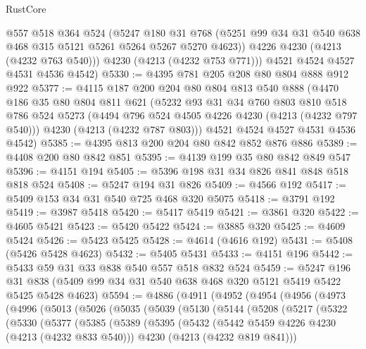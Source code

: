 \begin{lexlean}{RustCore}
\begin{coremodule}
          @557
          @518
          @364
          @524
          (@5247
            @180
            @31
            @768
            (@5251 @99 @34 @31 @540 @638 @468 @315 @5121 @5261 @5264 @5267 @5270 @4623))
          @4226
          @4230
          (@4213 (@4232 @763 @540)))
        @4230
        (@4213 (@4232 @753 @771)))
      @4521
      @4524
      @4527
      @4531
      @4536
      @4542)
@5330 := @4395 @781 @205 @208 @80 @804 @888 @912 @922
@5377 := @4115
    @187
    @200
    @204
    @80
    @804
    @813
    @540
    @888
    (@4470
      @186
      @35
      @80
      @804
      @811
      @621
      (@5232
        @93
        @31
        @34
        @760
        @803
        @810
        @518
        @786
        @524
        @5273
        (@4494 @796 @524 @4505 @4226 @4230 (@4213 (@4232 @797 @540)))
        @4230
        (@4213 (@4232 @787 @803)))
      @4521
      @4524
      @4527
      @4531
      @4536
      @4542)
@5385 := @4395 @813 @200 @204 @80 @842 @852 @876 @886
@5389 := @4408 @200 @80 @842 @851
@5395 := @4139 @199 @35 @80 @842 @849 @547
@5396 := @4151 @194
@5405 := @5396 @198 @31 @34 @826 @841 @848 @518 @818 @524
@5408 := @5247 @194 @31 @826
@5409 := @4566 @192
@5417 := @5409 @153 @34 @31 @540 @725 @468 @320 @5075
@5418 := @3791 @192
@5419 := @3987 @5418
@5420 := @5417 @5419
@5421 := @3861 @320
@5422 := @4605 @5421
@5423 := @5420 @5422
@5424 := @3885 @320
@5425 := @4609 @5424
@5426 := @5423 @5425
@5428 := @4614 (@4616 @192)
@5431 := @5408 (@5426 @5428 @4623)
@5432 := @5405 @5431
@5433 := @4151 @196
@5442 := @5433 @59 @31 @33 @838 @540 @557 @518 @832 @524
@5459 := @5247
    @196
    @31
    @838
    (@5409 @99 @34 @31 @540 @638 @468 @320 @5121 @5419 @5422 @5425 @5428 @4623)
@5594 := @4886
    (@4911
      (@4952
        (@4954
          (@4956
            (@4973
              (@4996
                (@5013
                  (@5026
                    (@5035
                      (@5039
                        (@5130
                          (@5144
                            (@5208
                              (@5217
                                (@5322
                                  (@5330
                                    (@5377
                                      (@5385
                                        (@5389
                                          (@5395
                                            (@5432
                                              (@5442 @5459 @4226 @4230 (@4213 (@4232 @833 @540)))
                                              @4230
                                              (@4213 (@4232 @819 @841)))

\end{coremodule}
\end{lexlean}
